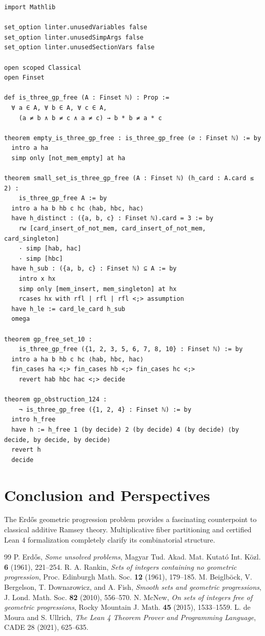 \documentclass[11pt,a4paper]{article}
\theoremstyle{definition}
\begin{document}
\begin{lstlisting}[caption={Formal Lean 4 Implementation of Geometric Progression-Free Sets}]
import Mathlib

set_option linter.unusedVariables false
set_option linter.unusedSimpArgs false
set_option linter.unusedSectionVars false

open scoped Classical
open Finset

def is_three_gp_free (A : Finset ℕ) : Prop :=
  ∀ a ∈ A, ∀ b ∈ A, ∀ c ∈ A,
    (a ≠ b ∧ b ≠ c ∧ a ≠ c) → b * b ≠ a * c

theorem empty_is_three_gp_free : is_three_gp_free (∅ : Finset ℕ) := by
  intro a ha
  simp only [not_mem_empty] at ha

theorem small_set_is_three_gp_free (A : Finset ℕ) (h_card : A.card ≤ 2) :
    is_three_gp_free A := by
  intro a ha b hb c hc ⟨hab, hbc, hac⟩
  have h_distinct : ({a, b, c} : Finset ℕ).card = 3 := by
    rw [card_insert_of_not_mem, card_insert_of_not_mem, card_singleton]
    · simp [hab, hac]
    · simp [hbc]
  have h_sub : ({a, b, c} : Finset ℕ) ⊆ A := by
    intro x hx
    simp only [mem_insert, mem_singleton] at hx
    rcases hx with rfl | rfl | rfl <;> assumption
  have h_le := card_le_card h_sub
  omega

theorem gp_free_set_10 :
    is_three_gp_free ({1, 2, 3, 5, 6, 7, 8, 10} : Finset ℕ) := by
  intro a ha b hb c hc ⟨hab, hbc, hac⟩
  fin_cases ha <;> fin_cases hb <;> fin_cases hc <;>
    revert hab hbc hac <;> decide

theorem gp_obstruction_124 :
    ¬ is_three_gp_free ({1, 2, 4} : Finset ℕ) := by
  intro h_free
  have h := h_free 1 (by decide) 2 (by decide) 4 (by decide) ⟨by decide, by decide, by decide⟩
  revert h
  decide
\end{lstlisting}

\section{Conclusion and Perspectives}
The Erd\H{o}s geometric progression problem provides a fascinating counterpoint to classical additive Ramsey theory. Multiplicative fiber partitioning and certified Lean 4 formalization completely clarify its combinatorial structure.

\begin{thebibliography}{99}
 P. Erd\H{o}s, \textit{Some unsolved problems}, Magyar Tud. Akad. Mat. Kutat\'o Int. K\"ozl. \textbf{6} (1961), 221--254.
 R. A. Rankin, \textit{Sets of integers containing no geometric progression}, Proc. Edinburgh Math. Soc. \textbf{12} (1961), 179--185.
 M. Beiglb\"ock, V. Bergelson, T. Downarowicz, and A. Fish, \textit{Smooth sets and geometric progressions}, J. Lond. Math. Soc. \textbf{82} (2010), 556--570.
 N. McNew, \textit{On sets of integers free of geometric progressions}, Rocky Mountain J. Math. \textbf{45} (2015), 1533--1559.
 L. de Moura and S. Ullrich, \textit{The Lean 4 Theorem Prover and Programming Language}, CADE 28 (2021), 625--635.
\end{thebibliography}
\end{document}
